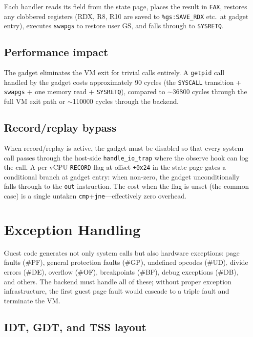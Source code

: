 Each handler reads its field from the state page, places the result in
\texttt{EAX}, restores any clobbered registers (RDX, R8, R10 are saved to
\texttt{\%gs:SAVE\_RDX} etc.\ at gadget entry), executes \texttt{swapgs} to
restore user GS, and falls through to \texttt{SYSRETQ}.

\subsection{Performance impact}

The gadget eliminates the VM exit for trivial calls entirely.  A
\texttt{getpid} call handled by the gadget costs approximately 90 cycles
(the \texttt{SYSCALL} transition + \texttt{swapgs} + one memory read +
\texttt{SYSRETQ}), compared to $\sim$\num{36800} cycles through the full
VM exit path or $\sim$\num{110000} cycles through the \Seccomp{} backend.

\subsection{Record/replay bypass}

When record/replay is active, the gadget must be disabled so that every
system call passes through the host-side \texttt{handle\_io\_trap} where
the observe hook can log the call.  A per-vCPU \texttt{RECORD} flag at
offset \texttt{+0x24} in the state page gates a conditional branch at gadget
entry: when non-zero, the gadget unconditionally falls through to the
\texttt{out} instruction.  The cost when the flag is unset (the common case)
is a single untaken \texttt{cmp}+\texttt{jne}---effectively zero overhead.


\section{Exception Handling}
\label{sec:kvm-exceptions}

Guest code generates not only system calls but also hardware exceptions:
page faults (\#PF), general protection faults (\#GP), undefined opcodes
(\#UD), divide errors (\#DE), overflow (\#OF), breakpoints (\#BP), debug
exceptions (\#DB), and others.  The \KVMvTwo{} backend must handle all of
these; without proper exception infrastructure, the first guest page fault
would cascade to a triple fault and terminate the VM.

\subsection{IDT, GDT, and TSS layout}

